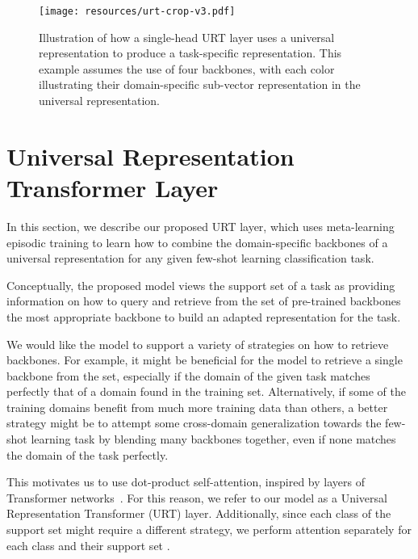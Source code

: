 \documentclass{article}
\begin{document}
\begin{figure}[t!]
\begin{center}
\texttt{[image: resources/urt-crop-v3.pdf]}
\end{center}
\caption{Illustration of how a single-head URT layer uses a universal representation to produce a task-specific representation. This example assumes the use of four backbones, with each color illustrating their domain-specific sub-vector representation in the universal representation. 
}
\label{fig:urt}
\end{figure}





\section{Universal Representation Transformer Layer}
\label{sec:urt-layer}

In this section, we describe our proposed URT layer, which uses meta-learning episodic training to learn how to combine the domain-specific backbones of a universal representation for any given few-shot learning classification task.

Conceptually, the proposed model views the support set  of a task as providing information on how to query and retrieve from the set  of  pre-trained backbones the most appropriate backbone to build an adapted representation  for the task. 

We would like the model to support a variety of strategies on how to retrieve backbones. For example, it might be beneficial for the model to retrieve a single backbone from the set, especially if the domain of the given task matches perfectly that of a domain found in the training set. Alternatively, if some of the training domains benefit from much more training data than others, a better strategy might be to attempt some cross-domain generalization towards the few-shot learning task by blending many backbones together, even if none matches
the domain of the task perfectly.

This motivates us to use dot-product self-attention, inspired by layers of Transformer networks~\cite{vaswani2017attention}. For this reason, we refer to our model as a Universal Representation Transformer (URT) layer.
Additionally, since each class of the support set might require a different strategy, we perform attention separately for each class and their support set .
\end{document}
